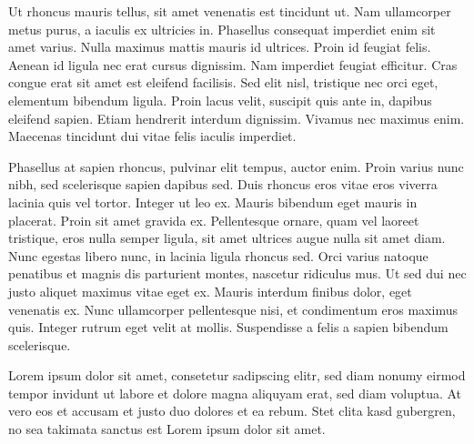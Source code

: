 \documentclass[12pt]{article}
\begin{document}
Ut rhoncus mauris tellus, sit amet venenatis est tincidunt ut. Nam ullamcorper metus purus, a iaculis ex ultricies in. Phasellus consequat imperdiet enim sit amet varius. Nulla maximus mattis mauris id ultrices. Proin id feugiat felis. Aenean id ligula nec erat cursus dignissim. Nam imperdiet feugiat efficitur. Cras congue erat sit amet est eleifend facilisis. Sed elit nisl, tristique nec orci eget, elementum bibendum ligula. Proin lacus velit, suscipit quis ante in, dapibus eleifend sapien. Etiam hendrerit interdum dignissim. Vivamus nec maximus enim. Maecenas tincidunt dui vitae felis iaculis imperdiet.

Phasellus at sapien rhoncus, pulvinar elit tempus, auctor enim. Proin varius nunc nibh, sed scelerisque sapien dapibus sed. Duis rhoncus eros vitae eros viverra lacinia quis vel tortor. Integer ut leo ex. Mauris bibendum eget mauris in placerat. Proin sit amet gravida ex. Pellentesque ornare, quam vel laoreet tristique, eros nulla semper ligula, sit amet ultrices augue nulla sit amet diam. Nunc egestas libero nunc, in lacinia ligula rhoncus sed. Orci varius natoque penatibus et magnis dis parturient montes, nascetur ridiculus mus. Ut sed dui nec justo aliquet maximus vitae eget ex. Mauris interdum finibus dolor, eget venenatis ex. Nunc ullamcorper pellentesque nisi, et condimentum eros maximus quis. Integer rutrum eget velit at mollis. Suspendisse a felis a sapien bibendum scelerisque.


Lorem ipsum dolor sit amet, consetetur sadipscing elitr, sed diam nonumy eirmod tempor invidunt ut labore et dolore magna aliquyam erat, sed diam voluptua. At vero eos et accusam et justo duo dolores et ea rebum. Stet clita kasd gubergren, no sea takimata sanctus est Lorem ipsum dolor sit amet.
\end{document}
